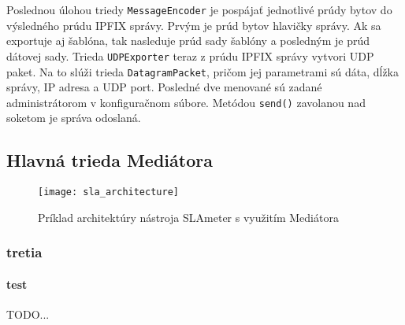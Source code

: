 Poslednou úlohou triedy \verb|MessageEncoder| je pospájať jednotlivé prúdy bytov do výsledného prúdu IPFIX 
správy. Prvým je prúd bytov hlavičky správy. Ak sa exportuje aj šablóna, tak nasleduje prúd sady šablóny 
a posledným je prúd dátovej sady. Trieda \verb|UDPExporter| teraz z prúdu IPFIX správy vytvori 
UDP paket. Na to slúži trieda \verb|DatagramPacket|, pričom jej parametrami sú dáta, dĺžka správy, 
IP adresa a UDP port. Posledné dve menované sú zadané administrátorom v konfiguračnom súbore. Metódou 
\verb|send()| zavolanou nad soketom je správa odoslaná.





\subsection{Hlavná trieda Mediátora}

\begin{figure}[ht!]
\centering
\texttt{[image: sla\_architecture]}
\caption{Príklad architektúry nástroja SLAmeter s využitím Mediátora}\label{o:sla_architecture}
\end{figure}

\subsubsection{tretia}

\paragraph{test}


TODO...

